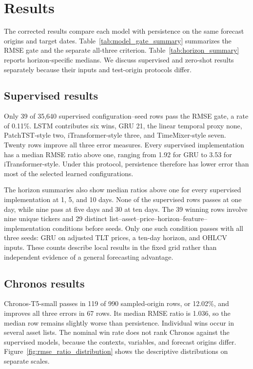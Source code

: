 \section{Results}

The corrected results compare each model with persistence on the same forecast origins and target dates. Table~\ref{tab:model_gate_summary} summarizes the RMSE gate and the separate all-three criterion. Table~\ref{tab:horizon_summary} reports horizon-specific medians. We discuss supervised and zero-shot results separately because their inputs and test-origin protocols differ.



\subsection{Supervised results}

Only 39 of 35,640 supervised configuration--seed rows pass the RMSE gate, a rate of 0.11\%. LSTM contributes six wins, GRU 21, the linear temporal proxy none, PatchTST-style two, iTransformer-style three, and TimeMixer-style seven. Twenty rows improve all three error measures. Every supervised implementation has a median RMSE ratio above one, ranging from 1.92 for GRU to 3.53 for iTransformer-style. Under this protocol, persistence therefore has lower error than most of the selected learned configurations.

The horizon summaries also show median ratios above one for every supervised implementation at 1, 5, and 10 days. None of the supervised rows passes at one day, while nine pass at five days and 30 at ten days. The 39 winning rows involve nine unique tickers and 29 distinct list--asset--price--horizon--feature--implementation conditions before seeds. Only one such condition passes with all three seeds: GRU on adjusted TLT prices, a ten-day horizon, and OHLCV inputs. These counts describe local results in the fixed grid rather than independent evidence of a general forecasting advantage.

\subsection{Chronos results}

Chronos-T5-small passes in 119 of 990 sampled-origin rows, or 12.02\%, and improves all three errors in 67 rows. Its median RMSE ratio is 1.036, so the median row remains slightly worse than persistence. Individual wins occur in several asset lists. The nominal win rate does not rank Chronos against the supervised models, because the contexts, variables, and forecast origins differ. Figure~\ref{fig:rmse_ratio_distribution} shows the descriptive distributions on separate scales.

